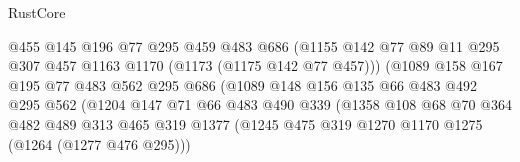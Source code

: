 \begin{lexlean}{RustCore}
\begin{coremodule}
                                @455
                                @145
                                @196
                                @77
                                @295
                                @459
                                @483
                                @686
                                (@1155
                                  @142
                                  @77
                                  @89
                                  @11
                                  @295
                                  @307
                                  @457
                                  @1163
                                  @1170
                                  (@1173 (@1175 @142 @77 @457)))
                                (@1089
                                  @158
                                  @167
                                  @195
                                  @77
                                  @483
                                  @562
                                  @295
                                  @686
                                  (@1089
                                    @148
                                    @156
                                    @135
                                    @66
                                    @483
                                    @492
                                    @295
                                    @562
                                    (@1204
                                      @147
                                      @71
                                      @66
                                      @483
                                      @490
                                      @339
                                      (@1358
                                        @108
                                        @68
                                        @70
                                        @364
                                        @482
                                        @489
                                        @313
                                        @465
                                        @319
                                        @1377
                                        (@1245
                                          @475
                                          @319
                                          @1270
                                          @1170
                                          @1275
                                          (@1264 (@1277 @476 @295)))

\end{coremodule}
\end{lexlean}

